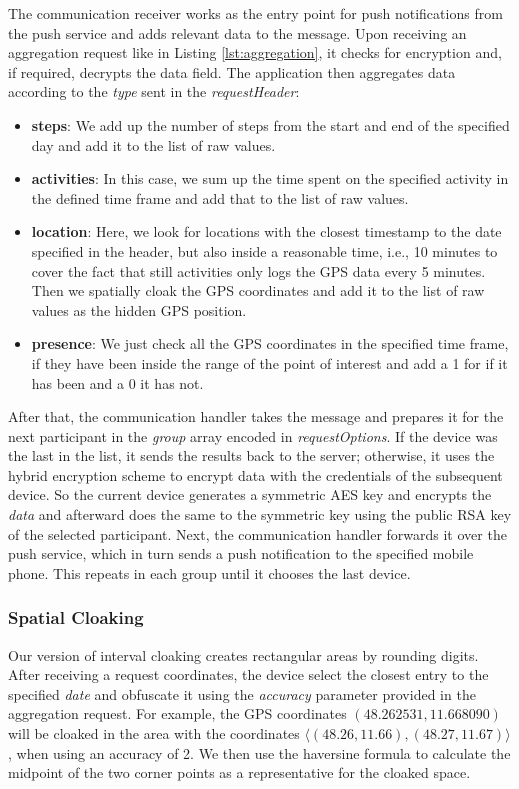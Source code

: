 The communication receiver works as the entry point for push notifications from the push service and adds relevant data to the message. Upon receiving an aggregation request like in Listing \ref{lst:aggregation}, it checks for encryption and, if required, decrypts the data field. The application then aggregates data according to the \textit{type} sent in the \textit{requestHeader}:
\begin{itemize}
    \item \textbf{steps}: We add up the number of steps from the start and end of the specified day and add it to the list of raw values.
    \item \textbf{activities}: In this case, we sum up the time spent on the specified activity in the defined time frame and add that to the list of raw values.
    \item \textbf{location}: Here, we look for locations with the closest timestamp to the date specified in the header, but also inside a reasonable time, i.e., 10 minutes to cover the fact that still activities only logs the GPS data every 5 minutes. Then we spatially cloak the GPS coordinates and add it to the list of raw values as the hidden GPS position.
    \item \textbf{presence}: We just check all the GPS coordinates in the specified time frame, if they have been inside the range of the point of interest and add a 1 for if it has been and a 0 it has not.
\end{itemize}

After that, the communication handler takes the message and prepares it for the next participant in the \textit{group} array encoded in \textit{requestOptions}. If the device was the last in the list, it sends the results back to the server; otherwise, it uses the hybrid encryption scheme to encrypt data with the credentials of the subsequent device. So the current device generates a symmetric AES key and encrypts the \textit{data} and afterward does the same to the symmetric key using the public RSA key of the selected participant. Next, the communication handler forwards it over the push service, which in turn sends a push notification to the specified mobile phone. This repeats in each group until it chooses the last device.

\subsubsection{Spatial Cloaking}
Our version of interval cloaking creates rectangular areas by rounding digits. After receiving a request coordinates, the device select the closest entry to the specified \textit{date} and obfuscate it using the \textit{accuracy} parameter provided in the aggregation request. For example, the GPS coordinates \((48.262531, 11.668090)\) will be cloaked in the area with the coordinates \(\langle(48.26, 11.66),(48.27, 11.67)\rangle\), when using an accuracy of 2. We then use the haversine formula to calculate the midpoint of the two corner points as a representative for the cloaked space. 


